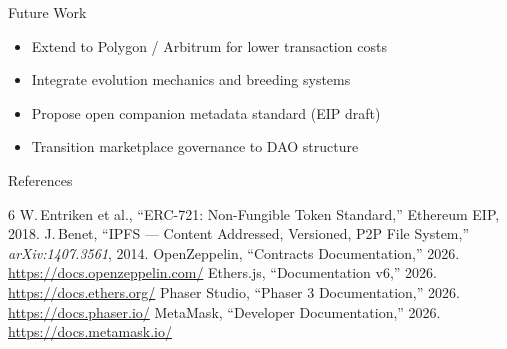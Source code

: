\documentclass[aspectratio=169, 10pt]{beamer}
\begin{document}
\begin{frame}{Future Work}
  \centering
  \vspace{0.15cm}

  \vspace{0.4cm}
  \begin{itemize}
    \item Extend to Polygon / Arbitrum for lower transaction costs
    \item Integrate evolution mechanics and breeding systems
    \item Propose open companion metadata standard (EIP draft)
    \item Transition marketplace governance to DAO structure
  \end{itemize}
\end{frame}

\begin{frame}{References}
  \small
  \begin{thebibliography}{6}
      W.\,Entriken et al.,
      ``ERC-721: Non-Fungible Token Standard,''
      Ethereum EIP, 2018.
      J.\,Benet,
      ``IPFS --- Content Addressed, Versioned, P2P File System,''
      \textit{arXiv:1407.3561}, 2014.
      OpenZeppelin,
      ``Contracts Documentation,'' 2026.
      \url{https://docs.openzeppelin.com/}
      Ethers.js,
      ``Documentation v6,'' 2026.
      \url{https://docs.ethers.org/}
      Phaser Studio,
      ``Phaser 3 Documentation,'' 2026.
      \url{https://docs.phaser.io/}
      MetaMask,
      ``Developer Documentation,'' 2026.
      \url{https://docs.metamask.io/}
  \end{thebibliography}
\end{frame}
\end{document}
